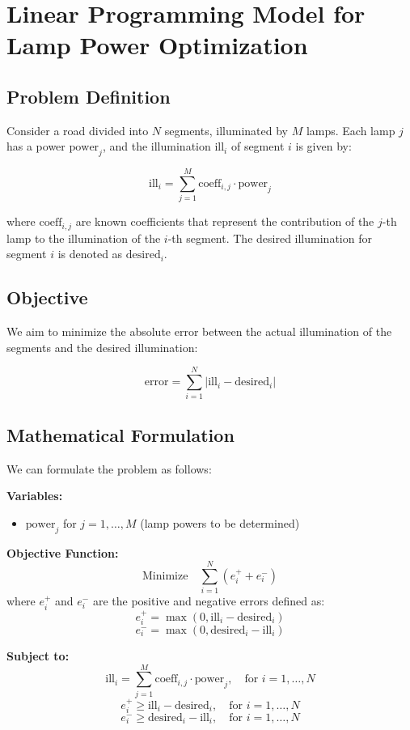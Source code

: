 \documentclass{article}
\begin{document}
\section*{Linear Programming Model for Lamp Power Optimization}

\subsection*{Problem Definition}
Consider a road divided into \( N \) segments, illuminated by \( M \) lamps. Each lamp \( j \) has a power \( \text{power}_j \), and the illumination \( \text{ill}_i \) of segment \( i \) is given by:

\[
\text{ill}_i = \sum_{j=1}^{M} \text{coeff}_{i,j} \cdot \text{power}_j
\]

where \( \text{coeff}_{i,j} \) are known coefficients that represent the contribution of the \( j \)-th lamp to the illumination of the \( i \)-th segment. The desired illumination for segment \( i \) is denoted as \( \text{desired}_i \).

\subsection*{Objective}
We aim to minimize the absolute error between the actual illumination of the segments and the desired illumination:

\[
\text{error} = \sum_{i=1}^{N} | \text{ill}_i - \text{desired}_i |
\]

\subsection*{Mathematical Formulation}
We can formulate the problem as follows:

\textbf{Variables:}
\begin{itemize}
    \item \( \text{power}_j \) for \( j = 1, \ldots, M \) (lamp powers to be determined)
\end{itemize}

\textbf{Objective Function:}
\[
\text{Minimize} \quad \sum_{i=1}^{N} \left( e_i^+ + e_i^- \right)
\]
where \( e_i^+ \) and \( e_i^- \) are the positive and negative errors defined as:
\[
e_i^+ = \max(0, \text{ill}_i - \text{desired}_i)
\]
\[
e_i^- = \max(0, \text{desired}_i - \text{ill}_i)
\]

\textbf{Subject to:}
\[
\text{ill}_i = \sum_{j=1}^{M} \text{coeff}_{i,j} \cdot \text{power}_j, \quad \text{for } i = 1, \ldots, N
\]
\[
e_i^+ \geq \text{ill}_i - \text{desired}_i, \quad \text{for } i = 1, \ldots, N
\]
\[
e_i^- \geq \text{desired}_i - \text{ill}_i, \quad \text{for } i = 1, \ldots, N
\]
\end{document}
